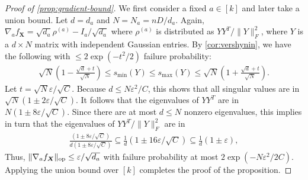 \documentclass{article}
\DeclarePairedDelimiter{\norm}{\lVert}{\rVert}
\newcommand{\op}{\operatorname{op}}
\renewcommand{\vec}{\bm}
\newcommand\eps{\varepsilon}
\newcommand\cN{\mathcal{N}}
\newcommand{\CF}[1]{{\color{purple}[CF: #1]}}
\begin{document}
\begin{proof}[Proof of \cref{prop:gradient-bound}]
We first consider a fixed $a\in[k]$ and later take a union bound.
Let $d = d_a$ and $N = N_a = n D/d_a$.
Again, $\nabla_a f_{\vec X} = \sqrt{d_a} \rho^{(a)} - I_a/\sqrt{d_a}$ where $\rho^{(a)}$ is distributed as $Y Y^T/\|Y\|_F^2$, where $Y$ is a $d \times N$ matrix with independent Gaussian entries.
By \cref{cor:vershynin}, we have the following with $\leq 2 \exp(-t^2/2)$ failure probability:
\begin{align*}
  \sqrt{N} \left( 1 -  \frac{\sqrt{d} + t }{\sqrt{N}}  \right)\leq s_{\min}(Y) \leq s_{\max}(Y) \leq  \sqrt{N} \left( 1 + \frac{\sqrt{d} + t }{\sqrt{N}} \right).
\end{align*}
Let $t = \sqrt{N} \eps / \sqrt{C}$.
Because $d \leq N \eps^2 / C$, this shows that all singular values are in $\sqrt{N} \left( 1 \pm 2\eps/\sqrt{C} \right)$.
It follows that the eigenvalues of $YY^T$ are in $N \left( 1 \pm 8\eps/\sqrt{C} \right)$.
Since there are at most $d \leq N$ nonzero eigenvalues, this implies in turn that the eigenvalues of $Y Y^T/\|Y\|_F^2$ are in
\begin{align*}
\frac {\left( 1 \pm 8\eps/\sqrt{C} \right)} {d \left( 1 \pm 8\eps/\sqrt{C} \right)} \subseteq \frac1d \left( 1 \pm 16\eps/\sqrt{C} \right) \subseteq \frac1d \left( 1 \pm \eps \right),
\end{align*}
Thus,
$\norm{\nabla_a f_{\vec X}}_{\op} \leq \eps/\sqrt{d_a}$
with failure probability at most $2 \exp(-N \eps^2/2C)$.
Applying the union bound over $[k]$ completes the proof of the proposition.
\end{proof}

\end{document}
